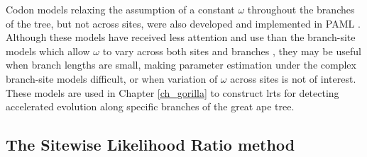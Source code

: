 Codon models relaxing the assumption of a constant $\omega$ throughout
the branches of the tree, but not across sites, were also developed
and implemented in PAML \citep{Yang1998,Yang1998a}. Although these
models have received less attention and use than the branch-site
models which allow $\omega$ to vary across both sites and branches
\citep{Zhang2005}, they may be useful when branch lengths are small,
making parameter estimation under the complex branch-site models
difficult, or when variation of $\omega$ across sites is not of
interest. These models are used in Chapter \ref{ch_gorilla} to
construct \acp{lrt} for detecting accelerated evolution along specific
branches of the great ape tree.

\subsection{The Sitewise Likelihood Ratio method}

